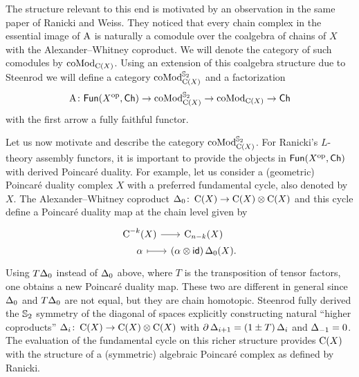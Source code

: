The structure relevant to this end is motivated by an observation in the same paper of Ranicki and Weiss.
They noticed that every chain complex in the essential image of $\operatorname{A}$ is naturally a comodule over the coalgebra of chains of $X$ with the Alexander--Whitney coproduct.
We will denote the category of such comodules by $\operatorname{coMod}_{\operatorname{C}(X)}$.
Using an extension of this coalgebra structure due to Steenrod we will define a category $\operatorname{coMod}^{\mathbb{S}_2}_{\operatorname{C}(X)}$ and a factorization
\[
\operatorname{A} \colon \mathsf{Fun}(X^{\mathrm{op}}, \mathsf{Ch}) \to \operatorname{coMod}^{\mathbb{S}_2}_{\operatorname{C}(X)} \to \operatorname{coMod}_{\operatorname{C}(X)} \to \mathsf{Ch}
\]
with the first arrow a fully faithful functor.

Let us now motivate and describe the category $\operatorname{coMod}^{\mathbb{S}_2}_{\operatorname{C}(X)}$.
For Ranicki's $L$-theory assembly functors, it is important to provide the objects in $\mathsf{Fun}(X^{\mathrm{op}}, \mathsf{Ch})$ with derived Poincar\'e duality.
For example, let us consider a (geometric) Poincar\'e duality complex $X$ with a preferred fundamental cycle, also denoted by $X$.
The Alexander--Whitney coproduct $\operatorname{\Delta}_0 \colon \operatorname{C}(X) \to \operatorname{C}(X) \otimes \operatorname{C}(X)$ and this cycle define a Poincar\'e duality map at the chain level given by
\[
\begin{tikzcd}[column sep=tiny,row sep=0]
	\cochains^{-k}(X) \arrow[r] & \chains_{n-k}(X) \\
	\alpha \arrow[r,mapsto] & (\alpha \ot \id)\copr_0(X).
\end{tikzcd}
\]
Using $T\!\operatorname{\Delta}_0$ instead of $\operatorname{\Delta}_0$ above, where $T$ is the transposition of tensor factors, one obtains a new Poincar\'e duality map.
These two are different in general since $\operatorname{\Delta}_0$ and $T\!\operatorname{\Delta}_0$ are not equal, but they are chain homotopic.
Steenrod \cite{steenrod1947products} fully derived the $\mathbb{S}_2$ symmetry of the diagonal of spaces explicitly constructing natural ``higher coproducts'' $\operatorname{\Delta}_i \colon \operatorname{C}(X) \to \operatorname{C}(X) \otimes \operatorname{C}(X)$ with $\partial \operatorname{\Delta}_{i+1} = (1 \pm T) \operatorname{\Delta}_i$ and $\operatorname{\Delta}_{-1} = 0$.
The evaluation of the fundamental cycle on this richer structure provides $\operatorname{C}(X)$ with the structure of a (symmetric) algebraic Poincar\'e complex as defined by Ranicki.

